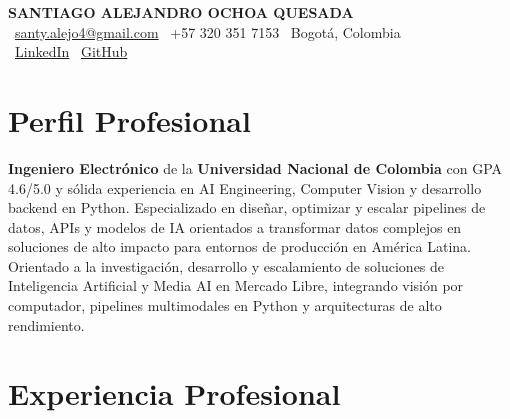 \documentclass[11pt,a4paper]{article}
\begin{document}
\thispagestyle{empty}
\color{darktext}

\begin{center}
    {\Huge \bfseries\color{accent} SANTIAGO ALEJANDRO OCHOA QUESADA} \\[6pt]
    {\small\color{darktext}
    \faEnvelope\ \href{mailto:santy.alejo4@gmail.com}{santy.alejo4@gmail.com}
    \quad\textcolor{bulletline}{\textbar}\quad
    \faPhone\ +57 320 351 7153
    \quad\textcolor{bulletline}{\textbar}\quad
    \faMapMarker*\ Bogotá, Colombia \\[4pt]
    \faLinkedin\ \href{https://linkedin.com/in/santiago-alejandro-ochoa-quesada-a07a18288/}{LinkedIn}
    \quad\textcolor{bulletline}{\textbar}\quad
    \faGithub\ \href{https://github.com/Sochoaq}{GitHub}
    }
\end{center}
\vspace{4pt}

\section{Perfil Profesional}
\textbf{Ingeniero Electrónico} de la \textbf{Universidad Nacional de Colombia} con GPA 4.6/5.0 y sólida experiencia en AI Engineering, Computer Vision y desarrollo backend en Python. Especializado en diseñar, optimizar y escalar pipelines de datos, APIs y modelos de IA orientados a transformar datos complejos en soluciones de alto impacto para entornos de producción en América Latina. Orientado a la investigación, desarrollo y escalamiento de soluciones de Inteligencia Artificial y Media AI en Mercado Libre, integrando visión por computador, pipelines multimodales en Python y arquitecturas de alto rendimiento.

\section{Experiencia Profesional}
\end{document}
